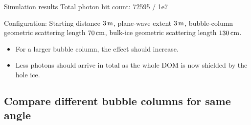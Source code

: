 \begin{frame}[fragile]{Simulation results}
  \tiny Total photon hit count: 72595 / 1e7

  \tiny Configuration: Starting distance $3\text{\,m}$, plane-wave extent $3\text{\,m}$, bubble-column geometric scattering length $70\text{\,cm}$, bulk-ice geometric scattering length $130\text{\,cm}$.
  \normalsize

  \begin{itemize}
    \item For a larger bubble column, the effect should increase. \checkmark
    \item Less photons should arrive in total \tiny as the whole DOM is now shielded by the hole ice. \normalsize \checkmark
  \end{itemize}
\end{frame}

\subsection{Compare different bubble columns for same angle}
